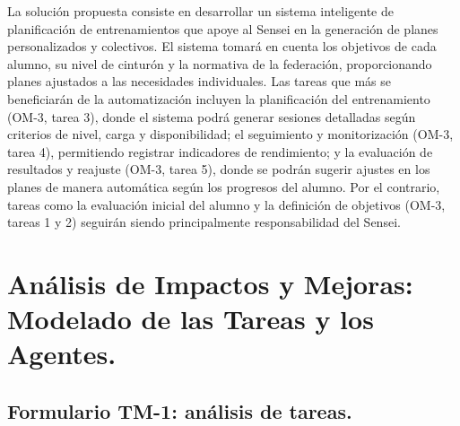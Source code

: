 \documentclass[12pt,a4paper,twoside,spanish]{article}      %
\begin{document}
       La solución propuesta consiste en desarrollar un sistema inteligente de planificación de entrenamientos que apoye al Sensei en la generación de 
       planes personalizados y colectivos. El sistema tomará en cuenta los objetivos de cada alumno, su nivel de cinturón y la normativa de la federación, 
       proporcionando planes ajustados a las necesidades individuales. Las tareas que más se beneficiarán de la automatización incluyen la planificación 
       del entrenamiento (OM-3, tarea 3), donde el sistema podrá generar sesiones detalladas según criterios de nivel, carga y disponibilidad; el 
       seguimiento y monitorización (OM-3, tarea 4), permitiendo registrar indicadores de rendimiento; y la evaluación de resultados y reajuste 
       (OM-3, tarea 5), donde se podrán sugerir ajustes en los planes de manera automática según los progresos del alumno. Por el contrario, tareas como 
       la evaluación inicial del alumno y la definición de objetivos (OM-3, tareas 1 y 2) seguirán siendo principalmente responsabilidad del Sensei.\\
        \pagebreak
        
    \section{Análisis de Impactos y Mejoras: Modelado de las Tareas y los Agentes.}
    
        \subsection{Formulario TM-1: análisis de tareas.}
\end{document}
